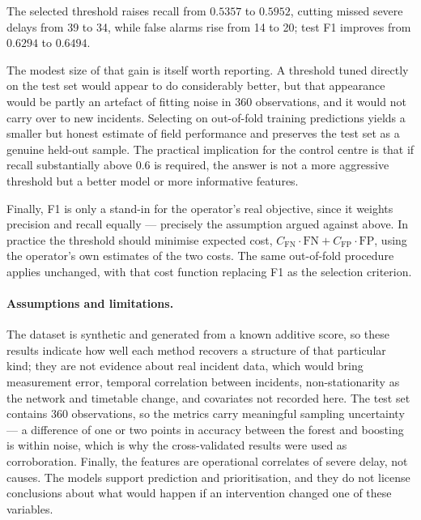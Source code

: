 \documentclass[11pt,a4paper]{article}
\begin{document}
The selected threshold raises recall from $0.5357$ to $0.5952$, cutting missed severe delays
from 39 to 34, while false alarms rise from 14 to 20; test F1 improves from $0.6294$ to
$0.6494$.

The modest size of that gain is itself worth reporting. A threshold tuned directly on the
test set would appear to do considerably better, but that appearance would be partly an
artefact of fitting noise in 360 observations, and it would not carry over to new incidents.
Selecting on out-of-fold training predictions yields a smaller but honest estimate of field
performance and preserves the test set as a genuine held-out sample. The practical
implication for the control centre is that if recall substantially above $0.6$ is required,
the answer is not a more aggressive threshold but a better model or more informative
features.

Finally, F1 is only a stand-in for the operator's real objective, since it weights precision
and recall equally --- precisely the assumption argued against above. In practice the
threshold should minimise expected cost,
$C_{\mathrm{FN}}\cdot \mathrm{FN} + C_{\mathrm{FP}}\cdot \mathrm{FP}$, using the operator's
own estimates of the two costs. The same out-of-fold procedure applies unchanged, with that
cost function replacing F1 as the selection criterion.

\paragraph{Assumptions and limitations.} The dataset is synthetic and generated from a known
additive score, so these results indicate how well each method recovers a structure of that
particular kind; they are not evidence about real incident data, which would bring
measurement error, temporal correlation between incidents, non-stationarity as the network
and timetable change, and covariates not recorded here. The test set contains 360
observations, so the metrics carry meaningful sampling uncertainty --- a difference of one
or two points in accuracy between the forest and boosting is within noise, which is why the
cross-validated results were used as corroboration. Finally, the features are operational
correlates of severe delay, not causes. The models support prediction and prioritisation,
and they do not license conclusions about what would happen if an intervention changed one
of these variables.
\end{document}
